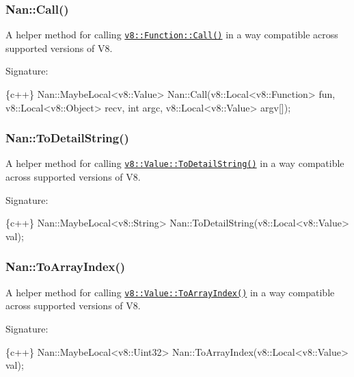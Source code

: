 \label{_api_nan_call}%
 \subsubsection*{Nan\+::\+Call()}

A helper method for calling \href{https://v8docs.nodesource.com/io.js-3.0/d5/d54/classv8_1_1_function.html#a468a89f737af0612db10132799c827c0}{\tt {\ttfamily v8\+::\+Function\+::\+Call()}} in a way compatible across supported versions of V8.

Signature\+:


\begin{DoxyCode}
\{c++\}
Nan::MaybeLocal<v8::Value> Nan::Call(v8::Local<v8::Function> fun, v8::Local<v8::Object> recv, int argc,
       v8::Local<v8::Value> argv[]);
\end{DoxyCode}


\label{_api_nan_to_detail_string}%
 \subsubsection*{Nan\+::\+To\+Detail\+String()}

A helper method for calling \href{https://v8docs.nodesource.com/io.js-3.0/dc/d0a/classv8_1_1_value.html#a2f9770296dc2c8d274bc8cc0dca243e5}{\tt {\ttfamily v8\+::\+Value\+::\+To\+Detail\+String()}} in a way compatible across supported versions of V8.

Signature\+:


\begin{DoxyCode}
\{c++\}
Nan::MaybeLocal<v8::String> Nan::ToDetailString(v8::Local<v8::Value> val);
\end{DoxyCode}


\label{_api_nan_to_array_index}%
 \subsubsection*{Nan\+::\+To\+Array\+Index()}

A helper method for calling \href{https://v8docs.nodesource.com/io.js-3.0/dc/d0a/classv8_1_1_value.html#acc5bbef3c805ec458470c0fcd6f13493}{\tt {\ttfamily v8\+::\+Value\+::\+To\+Array\+Index()}} in a way compatible across supported versions of V8.

Signature\+:


\begin{DoxyCode}
\{c++\}
Nan::MaybeLocal<v8::Uint32> Nan::ToArrayIndex(v8::Local<v8::Value> val);
\end{DoxyCode}


